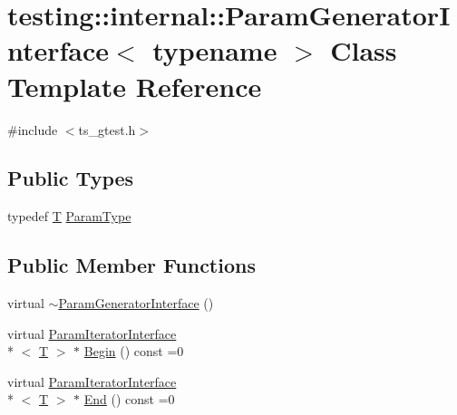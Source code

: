 \hypertarget{classtesting_1_1internal_1_1ParamGeneratorInterface}{\section{testing\-:\-:internal\-:\-:Param\-Generator\-Interface$<$ typename $>$ Class Template Reference}
\label{classtesting_1_1internal_1_1ParamGeneratorInterface}
}


{\ttfamily \#include $<$ts\-\_\-gtest.\-h$>$}

\subsection*{Public Types}
\begin{DoxyCompactItemize}
\item 
typedef \hyperlink{calib3d_8hpp_a3efb9551a871ddd0463079a808916717}{T} \hyperlink{classtesting_1_1internal_1_1ParamGeneratorInterface_acda0f17f9a2c528f4e85cae116a4400c}{Param\-Type}
\end{DoxyCompactItemize}
\subsection*{Public Member Functions}
\begin{DoxyCompactItemize}
\item 
virtual \hyperlink{classtesting_1_1internal_1_1ParamGeneratorInterface_a6038a513db081a329d1a0a4c3d32d046}{$\sim$\-Param\-Generator\-Interface} ()
\item 
virtual \hyperlink{classtesting_1_1internal_1_1ParamIteratorInterface}{Param\-Iterator\-Interface}\\*
$<$ \hyperlink{calib3d_8hpp_a3efb9551a871ddd0463079a808916717}{T} $>$ $\ast$ \hyperlink{classtesting_1_1internal_1_1ParamGeneratorInterface_ad1e1e72865b895c1bd5acc27e83a3b0b}{Begin} () const =0
\item 
virtual \hyperlink{classtesting_1_1internal_1_1ParamIteratorInterface}{Param\-Iterator\-Interface}\\*
$<$ \hyperlink{calib3d_8hpp_a3efb9551a871ddd0463079a808916717}{T} $>$ $\ast$ \hyperlink{classtesting_1_1internal_1_1ParamGeneratorInterface_ae82e6fc79efcef1c794ad333ffb5bf80}{End} () const =0
\end{DoxyCompactItemize}


